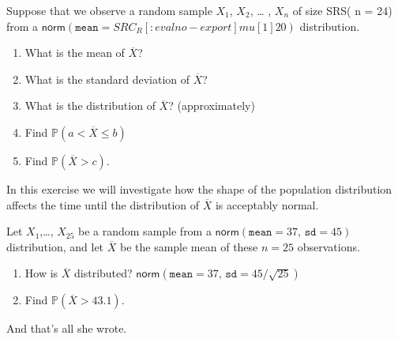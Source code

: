 \begin{xca}
Suppose that we observe a random sample \(X_{1}\), \(X_{2}\), \ldots{} ,
\(X_{n}\) of size SRS( n = 24) from a \(
\mathsf{norm}(\mathtt{mean}= SRC_R[:eval no-export]{mu[1]} 20 )\) distribution.
\begin{enumerate}
\item What is the mean of \(\overline{X}\)?
\item What is the standard deviation of \(\overline{X}\)?
\item What is the distribution of \(\overline{X}\)? (approximately)
\item Find \(\mathbb{P}(a< \overline{X} \leq b)\)
\item Find \(\mathbb{P}(\overline{X} > c)\).
\end{enumerate}
\end{xca}

\begin{xca}
\label{xca-clt123} In this exercise we will investigate how the shape of
the population distribution affects the time until the distribution of
\(\overline{X}\) is acceptably normal.
\end{xca}

\begin{xca}
Let \(X_{1}\),\ldots{}, \(X_{25}\) be a random sample from a
\(\mathsf{norm}(\mathtt{mean}=37,\,\mathtt{sd}=45)\) distribution, and
let \(\overline{X}\) be the sample mean of these \(n=25\)
observations.
\begin{enumerate}
\item How is \(\overline{X}\) distributed? 
\(\mathsf{norm}(\mathtt{mean}=37,\,\mathtt{sd}=45/\sqrt{25})\)
\item Find \(\mathbb{P}(\overline{X} > 43.1)\).
\end{enumerate}
And that's all she wrote.
\end{xca}
